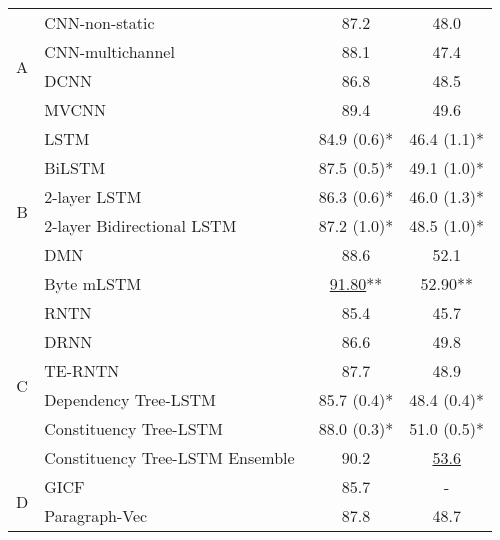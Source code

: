 \begin{table*}[]
\begin{tabular}{|c|l|ll|ll|}
		\multirow{4}{*}{A} & CNN-non-static~\cite{KimCNN} & \multicolumn{2}{c|}{87.2} & \multicolumn{2}{c|}{48.0} \Tstrut \\
		& CNN-multichannel~\cite{KimCNN} & \multicolumn{2}{c|}{88.1} & \multicolumn{2}{c|}{47.4} \\
		& DCNN~\cite{DCNN} & \multicolumn{2}{c|}{86.8} & \multicolumn{2}{c|}{48.5} \\
		& MVCNN~\cite{2-layer-cnn} & \multicolumn{2}{c|}{89.4} & \multicolumn{2}{c|}{49.6} \\
		\hline
		\multirow{6}{*}{B} & LSTM~\cite{treeLSTM}   & \multicolumn{2}{c|}{84.9 (0.6)*} & \multicolumn{2}{c|}{46.4 (1.1)*} \\
		& BiLSTM~\cite{treeLSTM}  & \multicolumn{2}{c|}{87.5 (0.5)*} & \multicolumn{2}{c|}{49.1 (1.0)*}   \\
		& 2-layer LSTM~\cite{treeLSTM} & \multicolumn{2}{c|}{86.3 (0.6)*} & \multicolumn{2}{c|}{46.0 (1.3)*} \\
		& 2-layer Bidirectional LSTM~\cite{treeLSTM} & \multicolumn{2}{c|}{87.2 (1.0)*} & \multicolumn{2}{c|}{48.5 (1.0)*} \\
		& DMN~\cite{attention-gru} & \multicolumn{2}{c|}{88.6 } & \multicolumn{2}{c|}{52.1} \\
		& Byte mLSTM~\cite{mlstm} & \multicolumn{2}{c|}{\underline{91.80}**} & \multicolumn{2}{c|}{52.90**} \\
		\hline
		\multirow{6}{*}{C} & RNTN~\cite{socher2013recursive}  & \multicolumn{2}{c|}{85.4} & \multicolumn{2}{c|}{45.7} \\
		& DRNN~\cite{IrsoyDRNN} & \multicolumn{2}{c|}{86.6} & \multicolumn{2}{c|}{49.8}  \\
		& TE-RNTN~\cite{tag-embedding-rnn} & \multicolumn{2}{c|}{87.7} & \multicolumn{2}{c|}{48.9} \\
		& Dependency Tree-LSTM~\cite{treeLSTM}  & \multicolumn{2}{c|}{85.7 (0.4)*} & \multicolumn{2}{c|}{48.4 (0.4)*}  \\
		& Constituency Tree-LSTM~\cite{treeLSTM} &  \multicolumn{2}{c|}{88.0 (0.3)*}  & \multicolumn{2}{c|}{51.0 (0.5)*} \\
		& Constituency Tree-LSTM Ensemble~\cite{LooksHHN17} & \multicolumn{2}{c|}{90.2} & \multicolumn{2}{c|}{\underline{53.6}} \\
		\hline
		\multirow{3}{*}{D} & GICF~\cite{group-instance} & \multicolumn{2}{c|}{85.7}  &  \multicolumn{2}{c|}{-} \\
		& Paragraph-Vec~\cite{ParagraphVec} & \multicolumn{2}{c|}{87.8} & \multicolumn{2}{c|}{48.7} \\

\end{tabular}
\end{table*}
